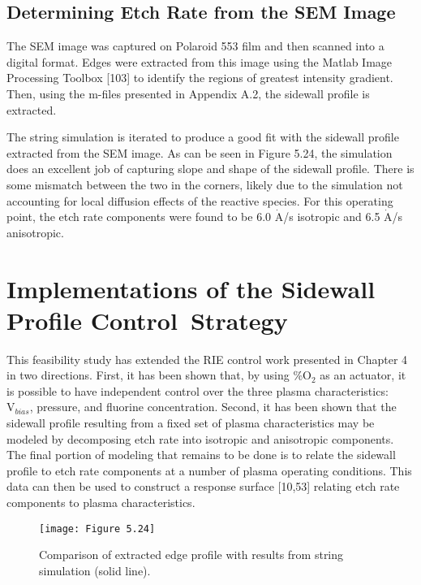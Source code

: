 \subsection{Determining Etch Rate from the SEM Image}
\tab The SEM image was captured on Polaroid 553 film and then scanned into a digital
format. Edges were extracted from this image using the Matlab Image Processing Toolbox
[103] to identify the regions of greatest intensity gradient. Then, using the m-files presented in Appendix A.2, the sidewall profile is extracted.

The string simulation is iterated to produce a good fit with the sidewall profile extracted
from the SEM image. As can be seen in Figure 5.24, the simulation does an excellent job
of capturing slope and shape of the sidewall profile. There is some mismatch between the
two in the corners, likely due to the simulation not accounting for local diffusion effects of
the reactive species. For this operating point, the etch rate components were found to be
6.0 $\dot{\text{A}}$/s isotropic and 6.5 $\dot{\text{A}}$/s anisotropic.

\section{Implementations of the Sidewall Profile Control~Strategy}
\tab This feasibility study has extended the RIE control work presented in Chapter 4 in
two directions. First, it has been shown that, by using \%$\text{O}_{2}$ as an actuator, it is possible to have independent control over the three plasma characteristics: $\text{V}_{bias}$, pressure, and fluorine concentration. Second, it has been shown that the sidewall profile resulting from a fixed set of plasma characteristics may be modeled by decomposing etch rate into isotropic and anisotropic components. The final portion of modeling that remains to be done is to relate the sidewall profile to etch rate components at a number of plasma operating conditions. This data can then be used to construct a response surface [10,53] relating etch rate components to plasma characteristics.

\begin{figure}[H]
	\centering	
	\texttt{[image: Figure 5.24]}
	\bf\caption{  Comparison of extracted edge profile with results from string simulation (solid line).}
	\label{fig:5.24}
\end{figure}


